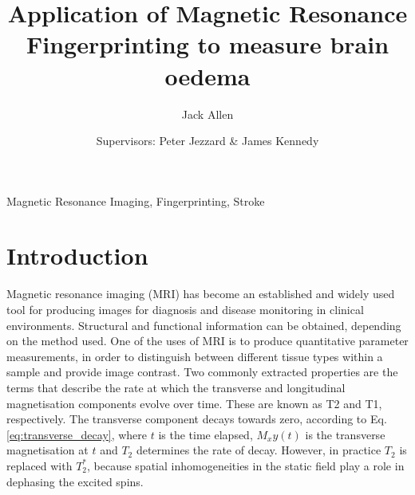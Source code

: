 \documentclass[3p, twocolumn]{elsarticle}
\begin{document}
\begin{frontmatter}

\title{Application of Magnetic Resonance Fingerprinting to measure brain oedema}

\author{Jack Allen}
\author{Supervisors: Peter Jezzard \& James Kennedy}
\address{University of Oxford, Oxford, UK.}





\begin{abstract}

\end{abstract}


\begin{keyword}
Magnetic Resonance Imaging, Fingerprinting, Stroke
\end{keyword}

\end{frontmatter}


\section{Introduction}

Magnetic resonance imaging (MRI) has become an established and widely used tool for producing images for diagnosis and disease monitoring in clinical environments. Structural and functional information can be obtained, depending on the method used. One of the uses of MRI is to produce quantitative parameter measurements, in order to distinguish between different tissue types within a sample and provide image contrast. Two commonly extracted properties are the terms that describe the rate at which the transverse and longitudinal magnetisation components evolve over time. These are known as T2 and T1, respectively. The transverse component decays towards zero, according to Eq. \eqref{eq:transverse_decay}, where $t$ is the time elapsed, $M_xy(t)$ is the transverse magnetisation at $t$ and $T_2$ determines the rate of decay. However, in practice $T_2$ is replaced with $T^{*}_{2}$, because spatial inhomogeneities in the static field play a role in dephasing the excited spins.
\end{document}
